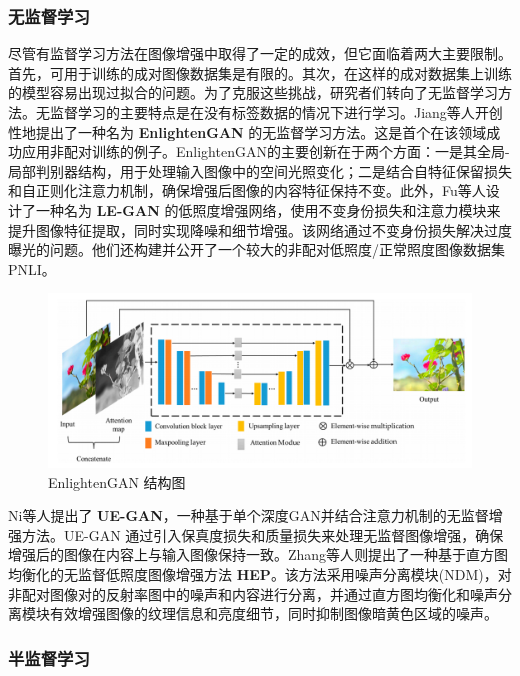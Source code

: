 \documentclass[a4paper]{ctexart}
\begin{document}
	\subsubsection{无监督学习}
	
	尽管有监督学习方法在图像增强中取得了一定的成效，但它面临着两大主要限制。首先，可用于训练的成对图像数据集是有限的。其次，在这样的成对数据集上训练的模型容易出现过拟合的问题。为了克服这些挑战，研究者们转向了无监督学习方法。无监督学习的主要特点是在没有标签数据的情况下进行学习。Jiang等人\cite{jiang2021enlightengan}开创性地提出了一种名为 \textbf{EnlightenGAN} 的无监督学习方法。这是首个在该领域成功应用非配对训练的例子。EnlightenGAN的主要创新在于两个方面：一是其全局-局部判别器结构，用于处理输入图像中的空间光照变化；二是结合自特征保留损失和自正则化注意力机制，确保增强后图像的内容特征保持不变。此外，Fu等人\cite{fu2022gan}设计了一种名为 \textbf{LE-GAN} 的低照度增强网络，使用不变身份损失和注意力模块来提升图像特征提取，同时实现降噪和细节增强。该网络通过不变身份损失解决过度曝光的问题。他们还构建并公开了一个较大的非配对低照度/正常照度图像数据集PNLI。
	
	\begin{figure}[htb]
		\centering 
		\includegraphics[width=0.7\columnwidth]{picture/LLIE/EnlightenGAN/EnlightenGAN}
		\caption{
			\label{fig: EnlightenGAN} 
			EnlightenGAN 结构图
		}
	\end{figure}
	
	Ni等人\cite{ni2020towards}提出了 \textbf{UE-GAN}，一种基于单个深度GAN并结合注意力机制的无监督增强方法。UE-GAN 通过引入保真度损失和质量损失来处理无监督图像增强，确保增强后的图像在内容上与输入图像保持一致。Zhang等人\cite{zhang2021unsupervised}则提出了一种基于直方图均衡化的无监督低照度图像增强方法 \textbf{HEP}。该方法采用噪声分离模块(NDM)，对非配对图像对的反射率图中的噪声和内容进行分离，并通过直方图均衡化和噪声分离模块有效增强图像的纹理信息和亮度细节，同时抑制图像暗黄色区域的噪声。
	
	\subsubsection{半监督学习}
	
\end{document}
